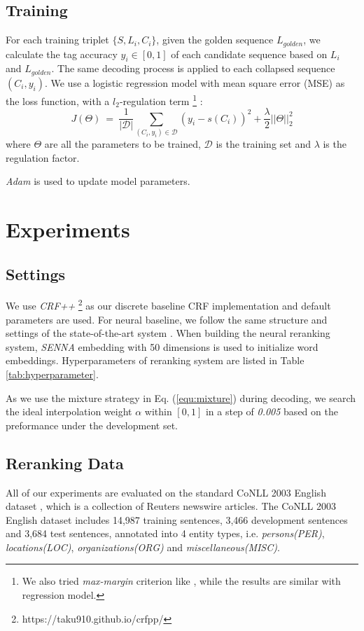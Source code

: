 \documentclass[11pt,a4paper]{article}
\begin{document}
\subsection{Training}
For each training triplet $\{S,L_i, C_i\}$, given the golden sequence $L_{golden}$, we calculate the tag accuracy $y_i \in [0,1]$  of each candidate sequence based on $L_i$ and $L_{golden}$. The same decoding process is applied to each collapsed sequence $(C_i, y_i)$. We use a logistic regression model with mean square error (MSE) as the loss function, with a $l_2$-regulation term \footnote{We also tried \textit{max-margin} criterion like \cite{zhu2015re}, while the results are similar with regression model.} :
\begin{equation}
J(\Theta) \:=\: \frac{1}{|\mathcal{D}|}\sum_{(C_i, y_i)\in \mathcal{D}}(y_i-s(C_i))^2 + \frac{\lambda}{2}||\Theta||_2^2
\end{equation}
where $\Theta$ are all the parameters to be trained, $\mathcal{D}$ is the training set and $\lambda$ is the regulation factor. 

\textit{Adam} \cite{kingma2014adam} is used to update model parameters.


\section{Experiments}
\subsection{Settings}
We use \textit{CRF++} \footnote{https://taku910.github.io/crfpp/} as our discrete baseline CRF implementation and default parameters are used. For neural baseline, we follow the same structure and settings of the state-of-the-art system \cite{ma2016end}. When building the neural reranking system, \textit{SENNA} embedding with 50 dimensions is used to initialize word embeddings. Hyperparameters of reranking system are listed in Table \ref{tab:hyperparameter}.

As we use the mixture strategy in Eq. (\ref{equ:mixture}) during decoding, we search the ideal interpolation weight $\alpha$ within $[0,1]$ in a step of \textit{0.005} based on the preformance under the development set.

\subsection{Reranking Data}
All of our experiments are evaluated on the standard CoNLL 2003 English dataset \cite{tjong2003introduction}, which is a collection of Reuters newswire articles. The CoNLL 2003 English dataset includes 14,987 training sentences, 3,466 development sentences and 3,684 test sentences, annotated into 4 entity types, i.e. \textit{persons(PER)}, \textit{locations(LOC)}, \textit{organizations(ORG)} and \textit{miscellaneous(MISC)}.
\end{document}
